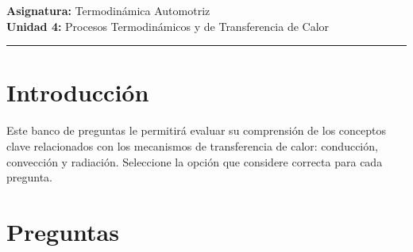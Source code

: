 \documentclass{article}
\begin{document}
	
	
	\textbf{Asignatura:} Termodinámica Automotriz \\
	\textbf{Unidad 4:} Procesos Termodinámicos y de Transferencia de Calor
	
	\vspace{5mm}
	\hrule
	\vspace{5mm}
	
	\section*{Introducción}
	
	Este banco de preguntas le permitirá evaluar su comprensión de los conceptos clave relacionados con los mecanismos de transferencia de calor: conducción, convección y radiación. Seleccione la opción que considere correcta para cada pregunta.
	
	\section*{Preguntas}
	
\end{document}
